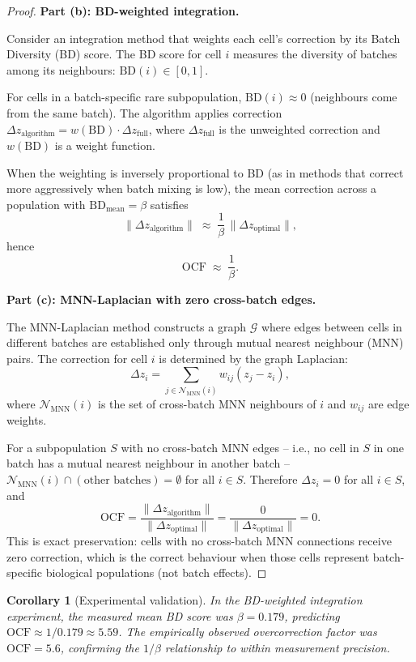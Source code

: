 \documentclass[10pt]{article}
\newtheorem{corollary}[theorem]{Corollary}
\begin{document}
\begin{proof}
\medskip
\textbf{Part (b): BD-weighted integration.}

Consider an integration method that weights each cell's correction by its
Batch Diversity (BD) score.  The BD score for cell $i$ measures the
diversity of batches among its neighbours:
$\mathrm{BD}(i) \in [0, 1]$.

For cells in a batch-specific rare subpopulation, $\mathrm{BD}(i) \approx 0$
(neighbours come from the same batch).  The algorithm applies correction
$\Delta z_{\mathrm{algorithm}} = w(\mathrm{BD})\cdot\Delta z_{\mathrm{full}}$,
where $\Delta z_{\mathrm{full}}$ is the unweighted correction and
$w(\mathrm{BD})$ is a weight function.

When the weighting is inversely proportional to BD (as in methods that
correct more aggressively when batch mixing is low), the mean correction
across a population with $\mathrm{BD}_{\mathrm{mean}} = \beta$ satisfies
\[
    \|\Delta z_{\mathrm{algorithm}}\|
    \;\approx\; \frac{1}{\beta}\,\|\Delta z_{\mathrm{optimal}}\|,
\]
hence
\[
    \mathrm{OCF} \;\approx\; \frac{1}{\beta}.
\]

\medskip
\textbf{Part (c): MNN-Laplacian with zero cross-batch edges.}

The MNN-Laplacian method constructs a graph $\mathcal{G}$ where edges
between cells in different batches are established only through mutual
nearest neighbour (MNN) pairs.  The correction for cell $i$ is determined
by the graph Laplacian:
\[
    \Delta z_i = \sum_{j \in \mathcal{N}_{\mathrm{MNN}}(i)}
    w_{ij}(z_j - z_i),
\]
where $\mathcal{N}_{\mathrm{MNN}}(i)$ is the set of cross-batch MNN
neighbours of $i$ and $w_{ij}$ are edge weights.

For a subpopulation $S$ with no cross-batch MNN edges -- i.e., no cell in
$S$ in one batch has a mutual nearest neighbour in another batch --
$\mathcal{N}_{\mathrm{MNN}}(i) \cap (\text{other batches}) = \emptyset$
for all $i \in S$.  Therefore $\Delta z_i = 0$ for all $i \in S$, and
\[
    \mathrm{OCF} = \frac{\|\Delta z_{\mathrm{algorithm}}\|}
                        {\|\Delta z_{\mathrm{optimal}}\|}
    = \frac{0}{\|\Delta z_{\mathrm{optimal}}\|} = 0.
\]
This is exact preservation: cells with no cross-batch MNN connections
receive zero correction, which is the correct behaviour when those cells
represent batch-specific biological populations (not batch effects).
\end{proof}

\begin{corollary}[Experimental validation]
\label{cor:ocf-validation}
In the BD-weighted integration experiment, the measured mean BD score was
$\beta = 0.179$, predicting $\mathrm{OCF} \approx 1/0.179 \approx 5.59$.
The empirically observed overcorrection factor was $\mathrm{OCF} = 5.6$,
confirming the $1/\beta$ relationship to within measurement precision.
\end{corollary}
\end{document}
